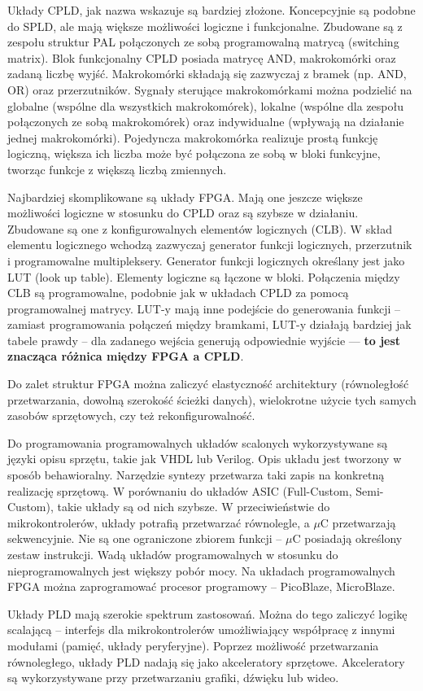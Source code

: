 Układy CPLD, jak nazwa wskazuje są bardziej złożone. Koncepcyjnie są podobne do SPLD, ale mają większe możliwości logiczne i funkcjonalne. Zbudowane są z zespołu struktur PAL połączonych ze sobą programowalną matrycą (switching matrix). Blok funkcjonalny CPLD posiada matrycę AND, makrokomórki oraz zadaną liczbę wyjść. Makrokomórki składają się zazwyczaj z bramek (np. AND, OR) oraz przerzutników. Sygnały sterujące makrokomórkami można podzielić na globalne (wspólne dla wszystkich makrokomórek), lokalne (wspólne dla zespołu połączonych ze sobą makrokomórek) oraz indywidualne (wpływają na działanie jednej makrokomórki). Pojedyncza makrokomórka realizuje prostą funkcję logiczną, większa ich liczba może być połączona ze sobą w bloki funkcyjne, tworząc funkcje z większą liczbą zmiennych. 

Najbardziej skomplikowane są układy FPGA. Mają one jeszcze większe możliwości logiczne w stosunku do CPLD oraz są szybsze w działaniu. Zbudowane są one z konfigurowalnych elementów logicznych (CLB). W skład elementu logicznego wchodzą zazwyczaj generator funkcji logicznych, przerzutnik i programowalne multipleksery. Generator funkcji logicznych określany jest jako LUT (look up table). Elementy logiczne są łączone w bloki. Połączenia między CLB są programowalne, podobnie jak w układach CPLD za pomocą programowalnej matrycy. LUT-y mają inne podejście do generowania funkcji -- zamiast programowania połączeń między bramkami, LUT-y działają bardziej jak tabele prawdy -- dla zadanego wejścia generują odpowiednie wyjście --- \textbf{to jest znacząca różnica między FPGA a CPLD}.

Do zalet struktur FPGA można zaliczyć elastyczność architektury (równoległość przetwarzania, dowolną szerokość ścieżki danych), wielokrotne użycie tych samych zasobów sprzętowych, czy też rekonfigurowalność.

Do programowania programowalnych układów scalonych wykorzystywane są języki opisu sprzętu, takie jak VHDL lub Verilog. Opis układu jest tworzony w sposób behawioralny. Narzędzie syntezy przetwarza taki zapis na konkretną realizację sprzętową. W porównaniu do układów ASIC (Full-Custom, Semi-Custom), takie układy są od nich szybsze. W przeciwieństwie do mikrokontrolerów, układy potrafią przetwarzać równolegle, a $\mu$C przetwarzają sekwencyjnie. Nie są one ograniczone zbiorem funkcji -- $\mu$C posiadają określony zestaw instrukcji. Wadą układów programowalnych w stosunku do nieprogramowalnych jest większy pobór mocy. Na układach programowalnych FPGA można zaprogramować procesor programowy -- PicoBlaze, MicroBlaze.

Układy PLD mają szerokie spektrum zastosowań. Można do tego zaliczyć logikę scalającą -- interfejs dla mikrokontrolerów umożliwiający współpracę z innymi modułami (pamięć, układy peryferyjne). Poprzez możliwość przetwarzania równoległego, układy PLD nadają się jako akceleratory sprzętowe. Akceleratory są wykorzystywane przy przetwarzaniu grafiki, dźwięku lub wideo.